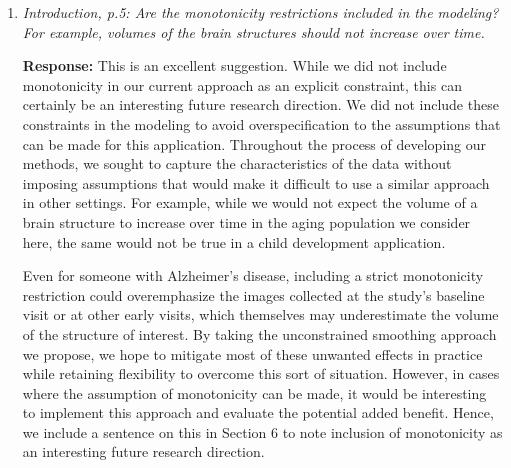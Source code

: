 \documentclass[12pt]{article}
\theoremstyle{definition}
\newcommand{\revision}[1]{\textcolor{blue}{#1}}
\begin{document}
\begin{enumerate}
\revision{Similarly, \cite{akudjedu2018comparative} found that FIRST and FreeSurfer showed strong correlation with manual segmentation for the caudate, but relatively poor absolute agreement and moderate relative consistency when applied to the hippocampus. When comparing estimated subcortical volumes obtained using FIRST and FreeSurfer in two consecutive yearly study visits, \cite{quilis-sancho2020comparative} found that considerable variability was present in the relative differences in subcortical volume estimates, even after removing outliers from analysis. Furthermore, this variability was much greater for FIRST than FreeSurfer, with standard deviations for relative volumetric difference in the left and right hippocampus reaching 12.2\% and 11.3\%, respectively \citep{quilis-sancho2020comparative}.}

\item \textit{Introduction, p.5: Are the monotonicity restrictions included in the modeling? For example, volumes of the brain structures should not increase over time.}

{\bf Response:} This is an excellent suggestion. While we did not include monotonicity in our current approach as an explicit constraint, this can certainly be an interesting future research direction. We did not include these constraints in the modeling to avoid overspecification to the assumptions that can be made for this application. Throughout the process of developing our methods, we sought to capture the characteristics of the data without imposing assumptions that would make it difficult to use a similar approach in other settings. For example, while we would not expect the volume of a brain structure to increase over time in the aging population we consider here, the same would not be true in a child development application.

Even for someone with Alzheimer's disease, including a strict monotonicity restriction could overemphasize the images collected at the study's baseline visit or at other early visits, which themselves may underestimate the volume of the structure of interest. By taking the unconstrained smoothing approach we propose, we hope to mitigate most of these unwanted effects in practice while retaining flexibility to overcome this sort of situation. However, in cases where the assumption of monotonicity can be made, it would be interesting to implement this approach and evaluate the potential added benefit. Hence, we include a sentence on this in Section 6 to note inclusion of monotonicity as an interesting future research direction. 


\end{enumerate}
\end{document}
